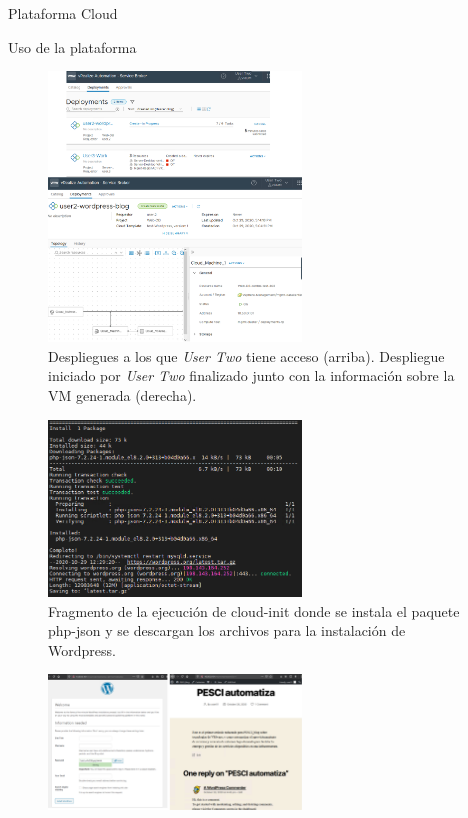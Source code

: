 \begin{subsection}{Plataforma Cloud}
\begin{subsubsection}{Uso de la plataforma}
\begin{figure}[h]
            \label{fig:catalog-user-2}
        \end{figure}
        \FloatBarrier
        \begin{figure}[h]
            \centering
            \includegraphics[width=0.6\textwidth]{imaxes/pruebaconcepto/vrealize/user-2-card-deploy.png}
            \caption{Despliegues a los que \textit{User Two} tiene acceso (arriba). Despliegue iniciado por \textit{User Two} finalizado junto con la información sobre la VM generada (derecha).}
            \label{fig:deployment-user-2}
        \end{figure}
        \FloatBarrier
        \begin{figure}[h]
            \centering
            \includegraphics[width=0.6\textwidth]{imaxes/pruebaconcepto/vrealize/cloud-init-commands-wordpress.png}
            \caption{Fragmento de la ejecución de cloud-init donde se instala el paquete php-json y se descargan los archivos para la instalación de Wordpress.}
            \label{fig:cloud-init-user-2}
        \end{figure}
        \FloatBarrier
        \begin{figure}[h]
            \centering
            \includegraphics[width=0.6\textwidth]{imaxes/pruebaconcepto/vrealize/wordpress-installation.png}

\end{figure}
\end{subsubsection}
\end{subsection}
